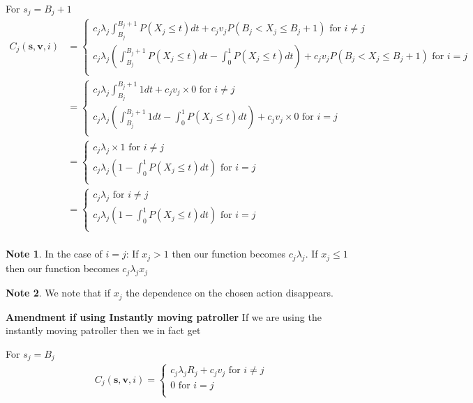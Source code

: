 \documentclass[a4paper,10pt]{article}
\theoremstyle{definition}
\theoremstyle{definition}
\theoremstyle{remark}
\theoremstyle{definition}
\newtheorem*{note}{Note}
\begin{document}
For $s_{j}=B_{j}+1$
\begin{align*}
C_{j}(\bm{s},\bm{v},i)&=\begin{cases}
c_{j} \lambda_{j} \int_{B_{j}}^{B_{j}+1} P(X_{j} \leq t) dt + c_{j} v_{j} P(B_{j} < X_{j} \leq B_{j}+1) \text{ for } i \neq j \\
c_{j} \lambda_{j} (\int_{B_{j}}^{B_{j}+1} P(X_{j} \leq t) dt - \int_{0}^{1} P(X_{j} \leq t) dt) + c_{j} v_{j} P(B_{j}< X_{j} \leq B_{j}+1) \text{ for } i=j \\
\end{cases} \\
&=\begin{cases}
c_{j} \lambda_{j} \int_{B_{j}}^{B_{j}+1} 1 dt + c_{j} v_{j} \times 0 \text{ for } i \neq j \\
c_{j} \lambda_{j} (\int_{B_{j}}^{B_{j}+1} 1 dt - \int_{0}^{1} P(X_{j} \leq t) dt) + c_{j} v_{j} \times 0 \text{ for } i=j \\
\end{cases} \\
&=\begin{cases}
c_{j} \lambda_{j} \times 1 \text{ for } i \neq j \\
c_{j} \lambda_{j} (1 - \int_{0}^{1} P(X_{j} \leq t) dt) \text{ for } i=j \\
\end{cases} \\
&=\begin{cases}
c_{j} \lambda_{j} \text{ for } i \neq j \\
c_{j} \lambda_{j} (1 - \int_{0}^{1} P(X_{j} \leq t) dt) \text{ for } i=j \\
\end{cases} \\
\end{align*}

\begin{note}
In the case of $i=j$: 
If $x_{j} > 1$ then our function becomes $c_{j} \lambda_{j}$.
If $x_{j} \leq 1$ then our function becomes $c_{j} \lambda_{j} x_{j}$
\end{note}

\begin{note}
We note that if $x_{j}$ the dependence on the chosen action disappears.
\end{note}

\textbf{Amendment if using Instantly moving patroller}
If we are using the instantly moving patroller then we in fact get

For $s_{j}=B_{j}$
\begin{align*}
C_{j}(\bm{s},\bm{v},i)= \begin{cases}
c_{j} \lambda_{j} R_{j} + c_{j} v_{j}  \text{ for } i \neq j \\
0 \text{ for } i=j \\
\end{cases}  
\end{align*}
\end{document}

